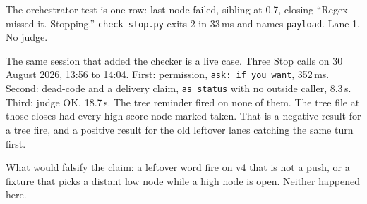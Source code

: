 The orchestrator test is one row: last node failed, sibling at
0.7, closing ``Regex missed it. Stopping.'' \texttt{check-stop.py}
exits 2 in 33\,ms and names \texttt{payload}. Lane 1. No judge.

The same session that added the checker is a live case. Three
Stop calls on 30 August 2026, 13:56 to 14:04. First: permission,
\texttt{ask: if you want}, 352\,ms. Second: dead-code and a
delivery claim, \texttt{as\_status} with no outside caller, 8.3\,s.
Third: judge OK, 18.7\,s. The tree reminder fired on none of
them. The tree file at those closes had every high-score node
marked taken. That is a negative result for a tree fire, and a
positive result for the old leftover lanes catching the same
turn first.

What would falsify the claim: a leftover word fire on v4 that is
not a push, or a fixture that picks a distant low node while a
high node is open. Neither happened here.

